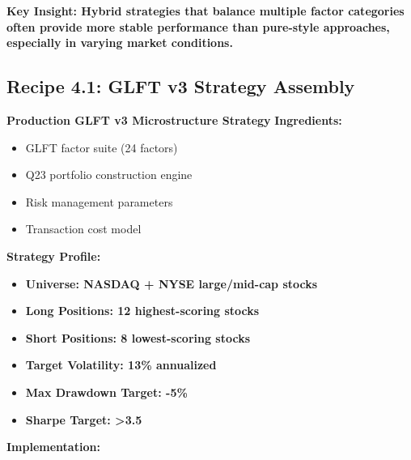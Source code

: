\documentclass[11pt,letterpaper,openany]{book}
\begin{document}
\textbf{Key Insight: Hybrid strategies that balance multiple factor categories often provide more stable performance than pure-style approaches, especially in varying market conditions.}

\subsection{Recipe 4.1: GLFT v3 Strategy Assembly}

\textbf{Production GLFT v3 Microstructure Strategy}
\textbf{Ingredients:}
\begin{itemize}
    \item GLFT factor suite (24 factors)
    \item Q23 portfolio construction engine
    \item Risk management parameters
    \item Transaction cost model
\end{itemize}
\textbf{Strategy Profile:}
\begin{itemize}
    \item \textbf{Universe: NASDAQ + NYSE large/mid-cap stocks}
    \item \textbf{Long Positions: 12 highest-scoring stocks}
    \item \textbf{Short Positions: 8 lowest-scoring stocks}
    \item \textbf{Target Volatility: 13\% annualized}
    \item \textbf{Max Drawdown Target: -5\%}
    \item \textbf{Sharpe Target: >3.5}
\end{itemize}
\textbf{Implementation:}
\end{document}
